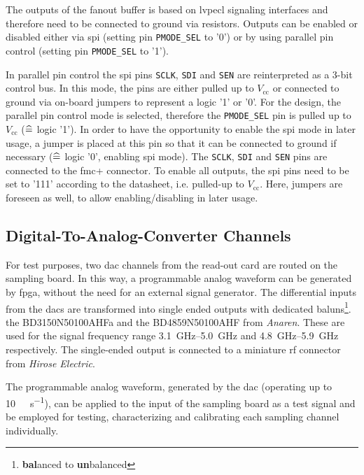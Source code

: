 The outputs of the fanout buffer is based on \gls{lvpecl} signaling interfaces and therefore need to be connected to ground via resistors.
Outputs can be enabled or disabled either via \gls{spi} (setting pin \texttt{PMODE\_SEL} to '0') or by using parallel pin control (setting pin \texttt{PMODE\_SEL} to '1'). 

In parallel pin control the \gls{spi} pins \texttt{SCLK}, \texttt{SDI} and \texttt{SEN} are reinterpreted as a 3-bit control bus.
In this mode, the pins are either pulled up to $V_\text{cc}$ or connected to ground via on-board jumpers to represent a logic '1' or '0'.
For the design, the parallel pin control mode is selected, therefore the \texttt{PMODE\_SEL} pin is pulled up to $V_\text{cc}$ ($\mathrel{\widehat{=}}$ logic '1').
In order to have the opportunity to enable the \gls{spi} mode in later usage, a jumper is placed at this pin so that it can be connected to ground if necessary ($\mathrel{\widehat{=}}$ logic '0', enabling \gls{spi} mode).
The \texttt{SCLK}, \texttt{SDI} and \texttt{SEN} pins are connected to the \gls{fmc}+ connector.
To enable all outputs, the \gls{spi} pins need to be set to '111' according to the datasheet, i.e. pulled-up to $V_\text{cc}$. 
Here, jumpers are foreseen as well, to allow enabling/disabling in later usage.

\subsection{Digital-To-Analog-Converter Channels}
For test purposes, two \gls{dac} channels from the read-out card are routed on the sampling board.
In this way, a programmable analog waveform can be generated by \gls{fpga}, without the need for an external signal generator. 
The differential inputs from the \glspl{dac} are transformed into single ended outputs with dedicated baluns\footnote{\textbf{bal}anced to \textbf{un}balanced}. the BD3150N50100AHFa and the BD4859N50100AHF from \textit{Anaren}. 
These are used for the signal frequency range \SIrange{3.1}{5.0}{\GHz} and \SIrange{4.8}{5.9}{\GHz} respectively.
The single-ended output is connected to a miniature \gls{rf} connector from \textit{Hirose Electric}.

The programmable analog waveform, generated by the \gls{dac} (operating up to \SI{10}{\giga \sample \per \second}), can be applied to the input of the sampling board as a test signal and be employed for testing, characterizing and calibrating each sampling channel individually.

